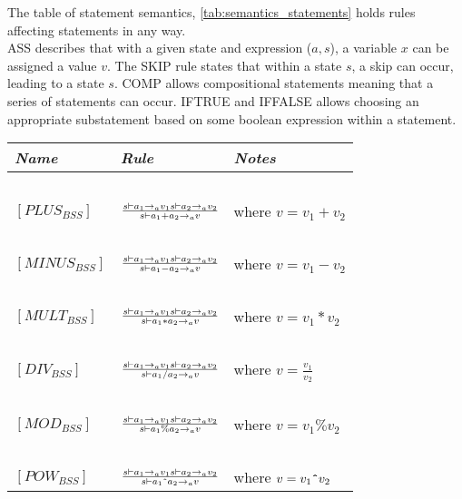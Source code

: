 The table of statement semantics, \ref{tab:semantics_statements} holds rules affecting statements in any way. \\
ASS describes that with a given state and expression ($a, s$), a variable $x$ can be assigned a value $v$. The SKIP rule states that within a state $s$, a skip can occur, leading to a state $s$. COMP allows compositional statements meaning that a series of statements can occur. IFTRUE and IFFALSE allows choosing an appropriate substatement based on some boolean expression within a statement. \\ 

\begin{table}[h]
	\begin{tabular}{|l|l|l|}
	\hline
	\emph{Name}			& \emph{Rule}																															& \emph{Notes} \\ \hline
			~			&															~																			& ~ \\
	$[PLUS_{BSS}]$		& $s \vdash a_{1} \rightarrow_{a} v_{1}  s \vdash a_{2} \rightarrow_{a} v_{2} \over s \vdash a_{1}+a_{2} \rightarrow_{a} v$ 			& where $v = v_{1}+v_{2}$ \\
			~			&															~																			& ~ \\
	$[MINUS_{BSS}]$		& $s \vdash a_{1} \rightarrow_{a} v_{1}  s \vdash a_{2} \rightarrow_{a} v_{2} \over s \vdash a_{1}-a_{2} \rightarrow_{a} v$ 			& where $v = v_{1}-v_{2}$ \\
			~			&															~																			& ~ \\
	$[MULT_{BSS}]$		& $s \vdash a_{1} \rightarrow_{a} v_{1}  s \vdash a_{2} \rightarrow_{a} v_{2} \over s \vdash a_{1}*a_{2} \rightarrow_{a} v$ 			& where $v = v_{1}*v_{2}$ \\
			~			&															~																			& ~ \\
	$[DIV_{BSS}]$		& $s \vdash a_{1} \rightarrow_{a} v_{1}  s \vdash a_{2} \rightarrow_{a} v_{2} \over s \vdash {a_{1}}/{a_{2}} \rightarrow_{a} v$ 		& where $v = \frac{v_{1}}{v_{2}}$ \\
			~			&																																		& ~ \\
	$[MOD_{BSS}]$		& $s \vdash a_{1} \rightarrow_{a} v_{1}  s \vdash a_{2} \rightarrow_{a} v_{2} \over s \vdash a_{1}\%a_{2} \rightarrow_{a} v$			& where $v = v_{1}\%v_{2}$ \\
			~			&															~																			& ~ \\
	$[POW_{BSS}]$		& $s \vdash a_{1} \rightarrow_{a} v_{1}  s \vdash a_{2} \rightarrow_{a} v_{2} \over s \vdash a_{1}\texttt{\^{}}a_{2} \rightarrow_{a} v$	& where $v = v_{1}\texttt{\^{}}v_{2}$ \\

\end{tabular}
\end{table}

